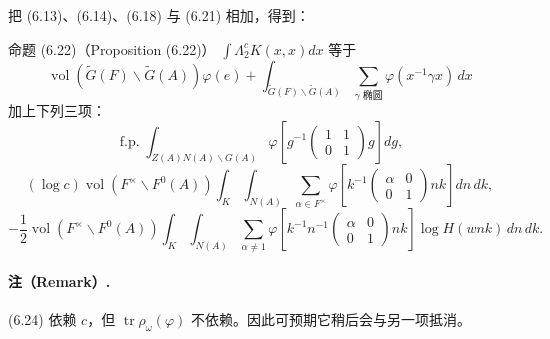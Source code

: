 把 (6.13)、(6.14)、(6.18) 与 (6.21) 相加，得到：
\begin{originaltheorem}{命题 (6.22)（Proposition (6.22)）}
$\int\Lambda_2^cK(x,x)dx$ 等于
\[
 \operatorname{vol}(\widetilde G(F)\backslash\widetilde G(A))\varphi(e)
 +\int_{\widetilde G(F)\backslash\widetilde G(A)}
 \sum_{\gamma\text{ 椭圆}}\varphi(x^{-1}\gamma x)\,dx
\]
加上下列三项：
\begin{equation}
 \operatorname{f.p.}\int_{Z(A)N(A)\backslash G(A)}
 \varphi\!\left[g^{-1}\begin{pmatrix}1&1\\0&1\end{pmatrix}g\right]dg,\tag{6.23}
\end{equation}
\begin{equation}
 (\log c)\operatorname{vol}(F^\times\backslash F^0(A))
 \int_K\int_{N(A)}\sum_{\alpha\in F^\times}
 \varphi\!\left[k^{-1}\begin{pmatrix}\alpha&0\\0&1\end{pmatrix}nk\right]dn\,dk,\tag{6.24}
\end{equation}
\begin{equation}
 -\frac12\operatorname{vol}(F^\times\backslash F^0(A))
 \int_K\int_{N(A)}\sum_{\alpha\ne1}
 \varphi\!\left[k^{-1}n^{-1}\begin{pmatrix}\alpha&0\\0&1\end{pmatrix}nk\right]
 \log H(wnk)\,dn\,dk.\tag{6.25}
\end{equation}
\end{originaltheorem}

\paragraph*{注（Remark）.}
(6.24) 依赖 $c$，但 $\operatorname{tr}\rho_\omega(\varphi)$ 不依赖。因此可预期它稍后会与另一项抵消。

